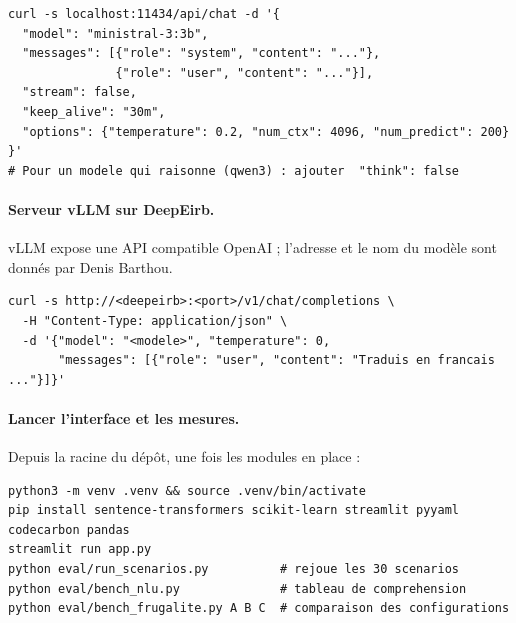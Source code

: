 \begin{code}
\footnotesize
\begin{verbatim}
curl -s localhost:11434/api/chat -d '{
  "model": "ministral-3:3b",
  "messages": [{"role": "system", "content": "..."},
               {"role": "user", "content": "..."}],
  "stream": false,
  "keep_alive": "30m",
  "options": {"temperature": 0.2, "num_ctx": 4096, "num_predict": 200}
}'
# Pour un modele qui raisonne (qwen3) : ajouter  "think": false
\end{verbatim}
\end{code}

\paragraph{Serveur vLLM sur DeepEirb.} vLLM expose une API compatible OpenAI ; l'adresse et le nom
du modèle sont donnés par Denis Barthou.

\begin{code}
\footnotesize
\begin{verbatim}
curl -s http://<deepeirb>:<port>/v1/chat/completions \
  -H "Content-Type: application/json" \
  -d '{"model": "<modele>", "temperature": 0,
       "messages": [{"role": "user", "content": "Traduis en francais ..."}]}'
\end{verbatim}
\end{code}

\paragraph{Lancer l'interface et les mesures.} Depuis la racine du dépôt, une fois les modules
en place :

\begin{code}
\footnotesize
\begin{verbatim}
python3 -m venv .venv && source .venv/bin/activate
pip install sentence-transformers scikit-learn streamlit pyyaml codecarbon pandas
streamlit run app.py
python eval/run_scenarios.py          # rejoue les 30 scenarios
python eval/bench_nlu.py              # tableau de comprehension
python eval/bench_frugalite.py A B C  # comparaison des configurations
\end{verbatim}
\end{code}

